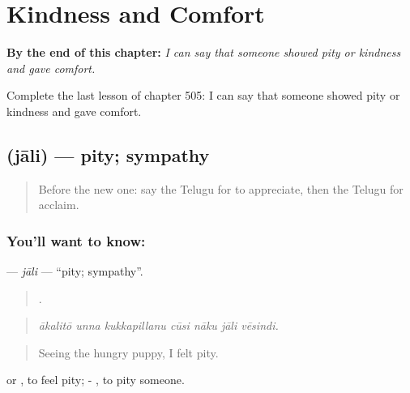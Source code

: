 
\chapter{Kindness and Comfort}
\label{ch:te-kindness-and-comfort}

\begin{chapteropening}
\textbf{By the end of this chapter:} \emph{I can say that someone showed pity or kindness and gave comfort.}

Complete the last lesson of chapter 505: I can say that someone showed pity or kindness and gave comfort.
\end{chapteropening}

\section[\texorpdfstring{\te{జాలి} (jāli)}{జాలి (jāli)}]{ (jāli) — pity; sympathy}

\label{lesson:TE-C505-jali}



\begin{quote}
Before the new one: say the Telugu for to appreciate, then the Telugu for acclaim.
\end{quote}

\subsection*{You'll want to know: }
\textbf{} — \emph{jāli} — \textquotedblleft{}pity; sympathy\textquotedblright{}.

\begin{quote}
      .
\end{quote}

\begin{quote}
\emph{ākalitō unna kukkapillanu cūsi nāku jāli vēsindi.}
\end{quote}

\begin{quote}
Seeing the hungry puppy, I felt pity.
\end{quote}

  or  , to feel pity; - , to pity someone.

